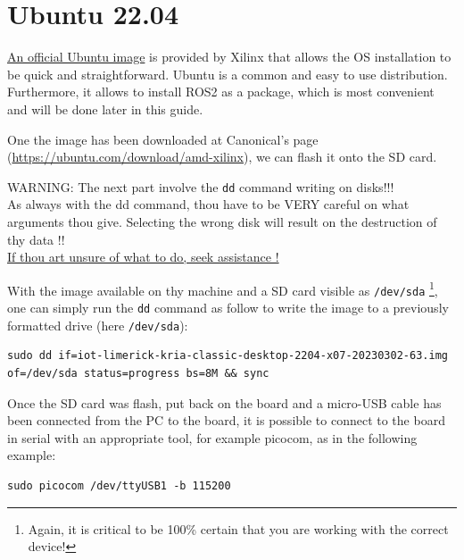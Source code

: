 \documentclass[10pt]{article}
\begin{document}
\section{Ubuntu 22.04}
\href{https://ubuntu.com/download/amd-xilinx}{An official Ubuntu image} is
provided by Xilinx that allows the OS installation to be quick and
straightforward. Ubuntu is a common and easy to use distribution. Furthermore,
it allows to install ROS2 as a package, which is most convenient and will be
done later in this guide.

One the image has been downloaded at Canonical's page
(\url{https://ubuntu.com/download/amd-xilinx}),
we can flash it onto the SD card.

\begin{tcolorbox}[colback=red!5!white,colframe=red!75!black]
  WARNING: The next part involve the \verb|dd| command writing on disks!!! \\
  As always with the dd command, thou have to be VERY careful on what arguments
  thou give. Selecting the wrong disk will result on the destruction of
  thy data !! \\
  \underline{If thou art unsure of what to do, seek assistance !}
\end{tcolorbox}


With the image available on thy machine and a SD card visible as \verb|/dev/sda|
\footnote{Again, it is critical to be 100\% certain that you are working with
  the correct device!}, one can simply run the \verb|dd| command as follow to
write the image to a previously formatted drive (here \verb|/dev/sda|):

\begin{tcolorbox}
\begin{verbatim}
sudo dd if=iot-limerick-kria-classic-desktop-2204-x07-20230302-63.img
of=/dev/sda status=progress bs=8M && sync
\end{verbatim}
\end{tcolorbox}

Once the SD card was flash, put back on the board and a micro-USB cable has been
connected from the PC to the board, it is possible to
connect to the board in serial with an appropriate tool, for example picocom,
as in the following example:
\begin{tcolorbox}
\begin{verbatim}
sudo picocom /dev/ttyUSB1 -b 115200
\end{verbatim}
\end{tcolorbox}
\end{document}
